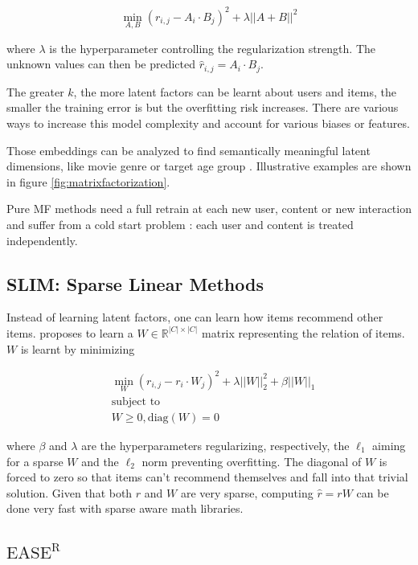 $$ \min_{A, B} (r_{i,j} - A_i \cdot B_j)^2 + \lambda ||A+B||^2$$

where $\lambda$ is the hyperparameter controlling the regularization strength. The unknown values can then be predicted $\hat{r}_{i,j} = A_i \cdot B_j$.

The greater $k$, the more latent factors can be learnt about users and items, the smaller the training error is but the overfitting risk increases. There are various ways to increase this model complexity and account for various biases or features.

Those embeddings can be analyzed to find semantically meaningful latent dimensions, like movie genre or target age group \citep{mflatents}. Illustrative examples are shown in figure \ref{fig:matrixfactorization}.

Pure MF methods need a full retrain at each new user, content or new interaction and suffer from a cold start problem : each user and content is treated independently. 

\subsection{SLIM: Sparse Linear Methods}

Instead of learning latent factors, one can learn how items recommend other items. \citet{slim} proposes to learn a $W \in \mathbb{R}^{|C|\times|C|}$ matrix representing the relation of items. $W$ is learnt by minimizing

\begin{equation}
\begin{split}
    & \min_W (r_{i,j} - r_i \cdot W_j)^2 + \lambda ||W||^2_2 + \beta ||W||_1 \\
    & \text{subject to} \\
    & W \geq 0, \text{diag}(W) = 0
\end{split}
\end{equation}

where $\beta$ and $\lambda$ are the hyperparameters regularizing, respectively, the $\ell_1$ aiming for a sparse $W$ and the $\ell_2$ norm preventing overfitting. The diagonal of $W$ is forced to zero so that items can't recommend themselves and fall into that trivial solution. Given that both $r$ and $W$ are very sparse, computing $\hat{r}=rW$ can be done very fast with sparse aware math libraries.

\subsection{$\text{EASE}^\text{R}$}

